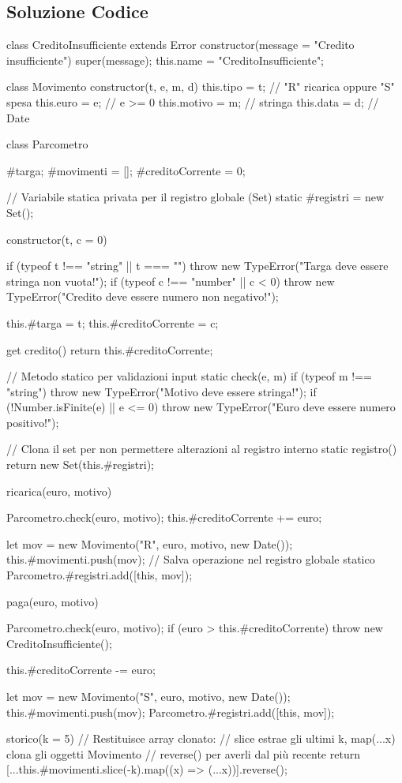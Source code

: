 \subsection{Soluzione Codice}
\begin{jsbox}[title={Soluzione Esercizio 3 - Metodi statici e Set}]
class CreditoInsufficiente extends Error {
  constructor(message = "Credito insufficiente") {
    super(message);
    this.name = "CreditoInsufficiente";
  }
}

class Movimento {
  constructor(t, e, m, d) {
    this.tipo = t;     // "R" ricarica oppure "S" spesa
    this.euro = e;     // e >= 0
    this.motivo = m;   // stringa
    this.data = d;     // Date
  }
}

class Parcometro {
  #targa;
  #movimenti = [];
  #creditoCorrente = 0;
  
  // Variabile statica privata per il registro globale (Set)
  static #registri = new Set();

  constructor(t, c = 0) {
    if (typeof t !== "string" || t === "") 
        throw new TypeError("Targa deve essere stringa non vuota!");
    if (typeof c !== "number" || c < 0) 
        throw new TypeError("Credito deve essere numero non negativo!");
        
    this.#targa = t;
    this.#creditoCorrente = c;
  }

  get credito() { return this.#creditoCorrente; }

  // Metodo statico per validazioni input
  static check(e, m) {
    if (typeof m !== "string") 
        throw new TypeError("Motivo deve essere stringa!");
    if (!Number.isFinite(e) || e <= 0) 
        throw new TypeError("Euro deve essere numero positivo!");
  }

  // Clona il set per non permettere alterazioni al registro interno
  static registro() {
    return new Set(this.#registri);
  }

  ricarica(euro, motivo) {
    Parcometro.check(euro, motivo);
    this.#creditoCorrente += euro;
    
    let mov = new Movimento("R", euro, motivo, new Date());
    this.#movimenti.push(mov);
    // Salva operazione nel registro globale statico
    Parcometro.#registri.add([this, mov]);
  }

  paga(euro, motivo) {
    Parcometro.check(euro, motivo);
    if (euro > this.#creditoCorrente) throw new CreditoInsufficiente();
    
    this.#creditoCorrente -= euro;
    
    let mov = new Movimento("S", euro, motivo, new Date());
    this.#movimenti.push(mov);
    Parcometro.#registri.add([this, mov]);
  }

  storico(k = 5) {
    // Restituisce array clonato: 
    // slice estrae gli ultimi k, map({...x}) clona gli oggetti Movimento
    // reverse() per averli dal più recente
    return [...this.#movimenti.slice(-k).map((x) => ({...x}))].reverse();
  }
}
\end{jsbox}
